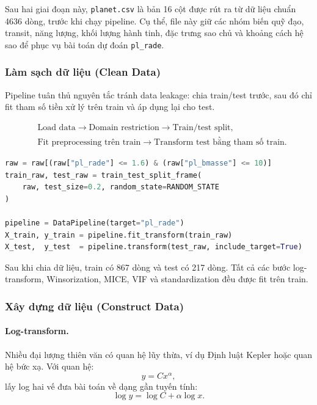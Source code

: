 Sau hai giai đoạn này, \texttt{planet.csv} là bản 16 cột được rút ra từ dữ liệu chuẩn 4636 dòng,
trước khi chạy pipeline. Cụ thể, file này giữ các nhóm biến quỹ đạo, transit, năng lượng, khối
lượng hành tinh, đặc trưng sao chủ và khoảng cách hệ sao để phục vụ bài toán dự đoán
\texttt{pl\_rade}.

\subsubsection{Làm sạch dữ liệu (Clean Data)}

Pipeline tuân thủ nguyên tắc tránh data leakage: chia train/test trước, sau đó chỉ fit tham số tiền
xử lý trên train và áp dụng lại cho test.

\begin{align}
    &\text{Load data}
    \rightarrow
    \text{Domain restriction}
    \rightarrow
    \text{Train/test split}, \nonumber\\
    &\text{Fit preprocessing trên train}
    \rightarrow
    \text{Transform test bằng tham số train}.
\end{align}

\begin{lstlisting}[language=Python, caption={Tách train/test trước khi fit preprocessing}]
raw = raw[(raw["pl_rade"] <= 1.6) & (raw["pl_bmasse"] <= 10)]
train_raw, test_raw = train_test_split_frame(
    raw, test_size=0.2, random_state=RANDOM_STATE
)

pipeline = DataPipeline(target="pl_rade")
X_train, y_train = pipeline.fit_transform(train_raw)
X_test,  y_test  = pipeline.transform(test_raw, include_target=True)
\end{lstlisting}

Sau khi chia dữ liệu, train có 867 dòng và test có 217 dòng. Tất cả các bước log-transform,
Winsorization, MICE, VIF và standardization đều được fit trên train.

\subsubsection{Xây dựng dữ liệu (Construct Data)}

\paragraph{Log-transform.}
Nhiều đại lượng thiên văn có quan hệ lũy thừa, ví dụ Định luật Kepler hoặc quan hệ bức xạ. Với
quan hệ:
\begin{equation}
    y = Cx^\alpha,
\end{equation}
lấy log hai vế đưa bài toán về dạng gần tuyến tính:
\begin{equation}
    \log y = \log C + \alpha \log x.
\end{equation}

